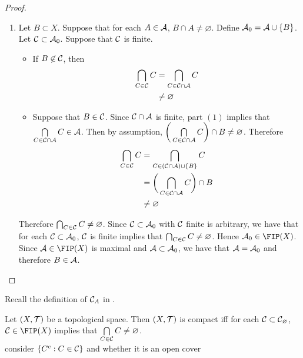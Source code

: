 \documentclass{book}
\begin{document}
\begin{proof}
\begin{enumerate}
			\item Let $B \subset X$. Suppose that for each $A \in \mathcal{A}$, $B \cap A \neq \varnothing$. Define $\mathcal{A}_0 = \mathcal{A} \cup \{B\}$. Let $\mathcal{C} \subset \mathcal{A}_0$. Suppose that $\mathcal{C}$ is finite. 
			\begin{itemize}
				\item If $B \not \in \mathcal{C}$, then 
				\begin{align*}
					\bigcap_{C \in \mathcal{C}} C
					& = \bigcap_{C \in \mathcal{C} \cap \mathcal{A}} C \\
					& \neq \varnothing
				\end{align*} 
				\item Suppose that $B \in \mathcal{C}$. Since $\mathcal{C} \cap \mathcal{A}$ is finite, part $(1)$ implies that $\bigcap\limits_{C \in \mathcal{C} \cap \mathcal{A}} C \in \mathcal{A}$. Then by assumption, $\bigg( \bigcap\limits_{C \in \mathcal{C} \cap \mathcal{A}} C \bigg) \cap B \neq \varnothing$.  Therefore 
				\begin{align*}
					\bigcap_{C \in \mathcal{C}} C
					& = \bigcap_{C \in (\mathcal{C} \cap \mathcal{A}) \cup \{B\}} C \\
					& = \bigg( \bigcap_{C \in \mathcal{C} \cap \mathcal{A}} C \bigg) \cap B \\
					& \neq \varnothing
				\end{align*}  
			\end{itemize}
			Therefore $\bigcap_{C \in \mathcal{C}} C \neq \varnothing$. Since $\mathcal{C} \subset \mathcal{A}_0$ with $\mathcal{C}$ finite is arbitrary, we have that for each $\mathcal{C} \subset \mathcal{A}_0$, $\mathcal{C}$ is finite implies that $\bigcap_{C \in \mathcal{C}} C \neq \varnothing$. Hence $\MA_0 \in \FIP(X)$. Since $\MA \in \FIP(X)$ is maximal and $\mathcal{A} \subset \mathcal{A}_0$, we have that $\mathcal{A} = \mathcal{A}_0$ and therefore $B \in \mathcal{A}$. 
		\end{enumerate}
	\end{proof}
	
	\begin{note}
		Recall the definition of $\mathcal{C}_A$ in .
	\end{note}
	
	\begin{ex} 
		Let $(X, \mathcal{T})$ be a topological space. Then $(X, \mathcal{T})$ is compact iff for each $\mathcal{C} \subset \mathcal{C}_\varnothing$, $\MC \in \FIP(X)$ implies that $\bigcap\limits_{C \in \mathcal{C}} C \neq \varnothing$. \\
		 consider $\{C^c: C \in \mathcal{C}\}$ and whether it is an open cover
	\end{ex}
\end{document}
